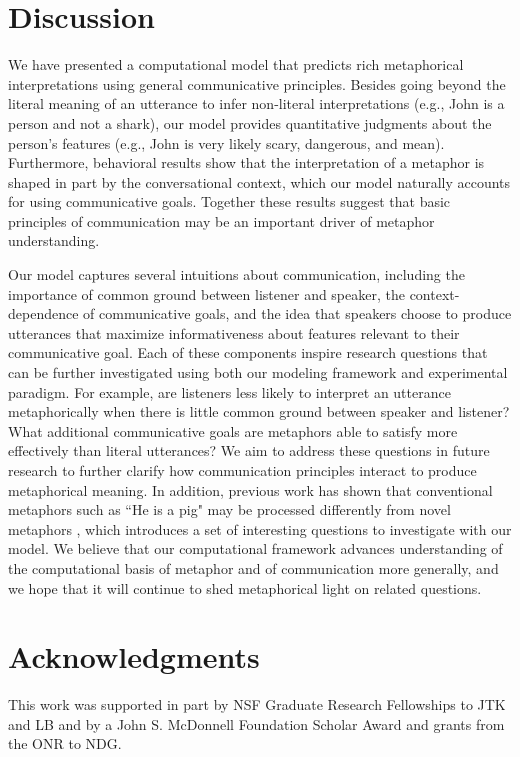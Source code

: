 \documentclass[10pt,letterpaper]{article}
\begin{document}
\section{Discussion}
We have presented a computational model that predicts rich metaphorical interpretations using general communicative principles. Besides going beyond the literal meaning of an utterance to infer non-literal interpretations (e.g., John is a person and not a shark), our model provides quantitative judgments about the person's features (e.g., John is very likely scary, dangerous, and mean). Furthermore, behavioral results show that the interpretation of a metaphor is shaped in part by the conversational context, which our model naturally accounts for using communicative goals. Together these results suggest that basic principles of communication may be an important driver of metaphor understanding.

Our model captures several intuitions about communication, including the importance of common ground between listener and speaker, the context-dependence of communicative goals, and the idea that speakers choose to produce utterances that maximize informativeness about features relevant to their communicative goal. Each of these components inspire research questions that can be further investigated using both our modeling framework and experimental paradigm. For example, are listeners less likely to interpret an utterance metaphorically when there is little common ground between speaker and listener? What additional communicative goals are metaphors able to satisfy more effectively than literal utterances? We aim to address these questions in future research to further clarify how communication principles interact to produce metaphorical meaning. In addition, previous work has shown that conventional metaphors such as ``He is a pig" may be processed differently from novel metaphors \cite{bowdle2005career}, which introduces a set of interesting questions to investigate with our model. We believe that our computational framework advances understanding of the computational basis of metaphor and of communication more generally, and we hope that it will continue to shed metaphorical light on related questions.

\section{Acknowledgments}
This work was supported in part by NSF Graduate Research Fellowships to JTK and LB and by a John S. McDonnell Foundation Scholar Award and grants from the ONR to NDG.



\setlength{\bibleftmargin}{.125in}
\setlength{\bibindent}{-\bibleftmargin}


\end{document}
